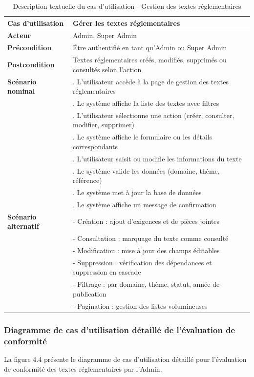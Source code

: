 \begin{longtable}{|>{\raggedright\arraybackslash}p{4cm}|>{\raggedright\arraybackslash}p{9cm}|}
\caption{Description textuelle du cas d'utilisation - Gestion des textes réglementaires}
\label{tab:manage_texts_usecase} \\
\hline
\textbf{Cas d'utilisation} & \textbf{Gérer les textes réglementaires} \\
\hline
\textbf{Acteur} & Admin, Super Admin \\
\hline
\textbf{Précondition} & Être authentifié en tant qu'Admin ou Super Admin \\
\hline
\textbf{Postcondition} & Textes réglementaires créés, modifiés, supprimés ou consultés selon l'action \\
\hline
\textbf{Scénario nominal} & 
1. L'utilisateur accède à la page de gestion des textes réglementaires \\
& 2. Le système affiche la liste des textes avec filtres \\
& 3. L'utilisateur sélectionne une action (créer, consulter, modifier, supprimer) \\
& 4. Le système affiche le formulaire ou les détails correspondants \\
& 5. L'utilisateur saisit ou modifie les informations du texte \\
& 6. Le système valide les données (domaine, thème, référence) \\
& 7. Le système met à jour la base de données \\
& 8. Le système affiche un message de confirmation \\
\hline
\textbf{Scénario alternatif} & 
- Création : ajout d'exigences et de pièces jointes \\
& - Consultation : marquage du texte comme consulté \\
& - Modification : mise à jour des champs éditables \\
& - Suppression : vérification des dépendances et suppression en cascade \\
& - Filtrage : par domaine, thème, statut, année de publication \\
& - Pagination : gestion des listes volumineuses \\
\hline
\end{longtable}

\subsubsection{Diagramme de cas d'utilisation détaillé de l'évaluation de conformité}
\noindent La figure 4.4 présente le diagramme de cas d'utilisation détaillé pour l'évaluation de conformité des textes réglementaires par l'Admin.

